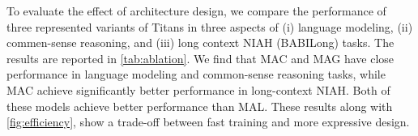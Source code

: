 \documentclass{article}
\newcommand{\head}[1]{\vspace{1.7mm}\noindent{{\textcolor{c3}{\bf #1.}}}}
\begin{document}
\begin{table}
    \centering
    \caption{Ablation Study on Titans. All components of Titans are positively contributing to its performance. }
    \label{tab:ablation}
\end{table}

\head{The Effect of Architectural Design}
To evaluate the effect of architecture design, we compare the performance of three represented variants of Titans in three aspects of (i) language modeling, (ii) commen-sense reasoning, and (iii) long context NIAH (BABILong) tasks. The results are reported in \autoref{tab:ablation}. We find that MAC and MAG have close performance in language modeling and common-sense reasoning tasks, while MAC achieve significantly better performance in long-context NIAH. Both of these models achieve better performance than MAL. These results along with \autoref{fig:efficiency}, show a trade-off between fast training and more expressive design.  
\end{document}
